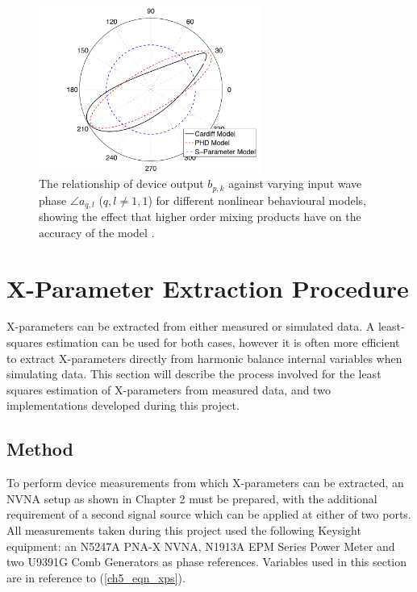 \documentclass[../thesis/thesis.tex]{subfiles}
\begin{document}
\begin{refsection}
\begin{figure}
	\centering
	\includegraphics[width=0.65\textwidth]{phasedep}
	\caption[Relationship of device output against input wave phase for different nonlinear behavioural models.]{The relationship of device output $b_{p,k}$ against varying input wave phase $\angle a_{q,l}$ ($q, l \ne 1, 1$) for different nonlinear behavioural models, showing the effect that higher order mixing products have on the accuracy of the model \cite{Bespalko_2016}.}
	\label{ch5_fig_phasedep}
\end{figure}

\section{X-Parameter Extraction Procedure}

X-parameters can be extracted from either measured or simulated data. A least-squares estimation can be used for both cases, however it is often more efficient to extract X-parameters directly from harmonic balance internal variables when simulating data. This section will describe the process involved for the least squares estimation of X-parameters from measured data, and two implementations developed during this project.

\subsection{Method}

To perform device measurements from which X-parameters can be extracted, an NVNA setup as shown in Chapter 2 must be prepared, with the additional requirement of a second signal source which can be applied at either of two ports. All measurements taken during this project used the following Keysight equipment: an N5247A PNA-X NVNA, N1913A EPM Series Power Meter and two U9391G Comb Generators as phase references. Variables used in this section are in reference to (\ref{ch5_eqn_xps}).


\end{refsection}
\end{document}
